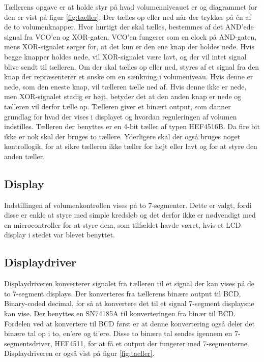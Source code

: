 Tællerens opgave er at holde styr på hvad volumenniveauet er og diagrammet for den er vist på figur \ref{fig:taeller}. Der tælles op eller ned når der trykkes på én af de to volumenknapper. Hvor hurtigt der skal tælles, bestemmes af det AND'ede signal fra VCO'en og XOR-gaten. VCO'en fungerer som en clock på AND-gaten, mens XOR-signalet sørger for, at det kun er den ene knap der holdes nede. Hvis begge knapper holdes nede, vil XOR-signalet være lavt, og der vil intet signal blive sendt til tælleren. Om der skal tælles op eller ned, styres af et signal fra den knap der repræsenterer et ønske om en sænkning i volumeniveau. Hvis denne er nede, som den eneste knap, vil tælleren tælle ned af. Hvis denne ikke er nede, men XOR-signalet stadig er højt, betyder det at den anden knap er nede og tælleren vil derfor tælle op. Tælleren giver et binært output, som danner grundlag for hvad der vises i displayet og hvordan reguleringen af volumen indstilles. Tælleren der benyttes er en 4-bit tæller af typen HEF4516B. Da fire bit ikke er nok skal der bruges to tællere. Yderligere skal der også bruges noget kontrollogik, for at sikre tælleren ikke tæller for højt eller lavt og for at styre den anden tæller.

\subsection*{Display}
\label{volumenkontrol-design-display}
Indstillingen af volumenkontrollen vises på to 7-segmenter. Dette er valgt, fordi disse er enkle at styre med simple kredsløb og det derfor ikke er nødvendigt med en microcontroller for at styre dem, som tilfældet havde været, hvis et LCD-display i stedet var blevet benyttet.

\subsection*{Displaydriver}
\label{volumenkontrol-design-display_driver}
Displaydriveren konverterer signalet fra tælleren til et signal der kan vises på de to 7-segment displays. Der konverteres fra tællerens binære output til BCD, Binary-coded decimal, for så at konvertere det til et signal 7-segment displaysne kan vise. Der benyttes en SN74185A til konverteringen fra binær til BCD. Fordelen ved at konvertere til BCD først er at denne konvertering også deler det binære tal op i to, en'ere og ti'ere. Disse to binære tal sendes igennem en 7-segmentsdriver, HEF4511, for at få et output der fungerer med 7-segmenterne. Displaydriveren er også vist på figur \ref{fig:taeller}.

